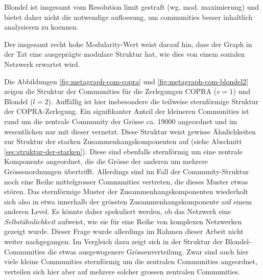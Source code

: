 Blondel ist insgesamt vom Resolution limit gestraft
(wg. mod. maximierung) und bietet daher nicht die notwendige
aufloesung, um communities besser inhaltlich analysieren zu koennen.

Der insgesamt recht hohe Modularity-Wert weist darauf hin, dass der
Graph in der Tat eine ausgepr\"agte modulare Struktur hat, wie dies
von einem sozialen Netzwerk erwartet wird.


Die Abbildungen \ref{fig:metagraph-com-copra} und
\ref{fig:metagraph-com-blondel2} zeigen die Struktur der Communities
f\"ur die Zerlegungen COPRA ($v=1$) und Blondel ($l=2$). Auff\"allig
ist hier insbesondere die teilweise sternf\"ormige Struktur der
COPRA-Zerlegung. Ein signifikanter Anteil der kleineren Communities
ist rund um die zentrale Community der Gr\"osse ca. 19000 angeordnet
und im wesentlichen nur mit dieser vernetzt. Diese Struktur weist
gewisse \"Ahnlichkeiten zur Struktur der starken
Zusammenhangskomponenten auf (siehe Abschnitt
\ref{sec:struktur-der-starken}). Diese sind ebenfalls sternf\"ormig um
eine zentrale Komponente angeordnet, die die Gr\"osse der anderen um
mehrere Gr\"ossenordnungen \"ubertrifft. Allerdings sind im Fall der
Community-Struktur noch eine Reihe mittelgrosser Communities
vertreten, die dieses Muster etwas st\"oren. Das sternf\"ormige Muster
der Zusammenhangskomponenten wiederholt sich also in etwa innerhalb
der gr\"ossten Zusammenhangskomponente auf einem anderen Level. Es
k\"onnte daher spekuliert werden, ob das Netzwerk eine
\emph{Selbst\"ahnlichkeit} aufweist, wie sie f\"ur eine Reihe von
komplexen Netzwerken gezeigt wurde\cite{Song2005}. Dieser Frage wurde
allerdings im Rahmen dieser Arbeit nicht weiter nachgegangen. Im
Vergleich dazu zeigt sich in der Struktur der Blondel-Communities die
etwas ausgewogenere Gr\"ossenverteilung. Zwar sind auch hier viele
kleine Communities sternf\"ormig um die zentralen Communities
angeordnet, verteilen sich hier aber auf mehrere solcher grossen
zentralen Communities.

